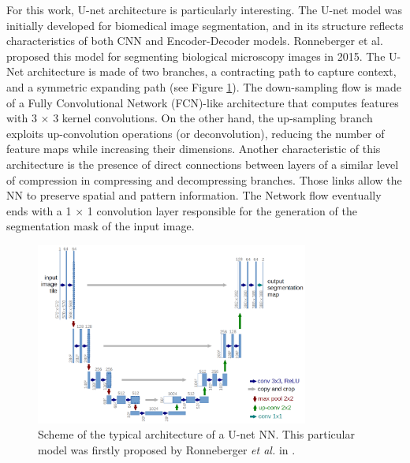 \documentclass[12pt,a4paper]{report}
\begin{document}
For this work, U-net architecture is particularly interesting. The U-net model was initially developed for biomedical image segmentation, and in its structure reflects characteristics of both CNN and Encoder-Decoder models. Ronneberger et al.\cite{U-net} proposed this model for segmenting biological microscopy images in 2015. The U-Net architecture is made of two branches, a contracting path to capture context, and a symmetric expanding path (see Figure \ref{fig:unet}). The down-sampling flow is made of a Fully Convolutional Network (FCN)-like architecture that computes features with 3 $\times$ 3 kernel convolutions. On the other hand, the up-sampling branch exploits up-convolution operations (or deconvolution), reducing the number of feature maps while increasing their dimensions. Another characteristic of this architecture is the presence of direct connections between layers of a similar level of compression in compressing and decompressing branches. Those links allow the NN to preserve spatial and pattern information. The Network flow eventually ends with a 1 $\times$ 1 convolution layer responsible for the generation of the segmentation mask of the input image.

    \begin{figure}
        \centering
        \includegraphics[width = 0.8\textwidth]{images/unet}
        \caption{Scheme of the typical architecture of a U-net NN. This particular model was firstly proposed by Ronneberger \textit{et al.} in \cite{U-net}.}
        \label{fig:unet}
    \end{figure}
\end{document}

